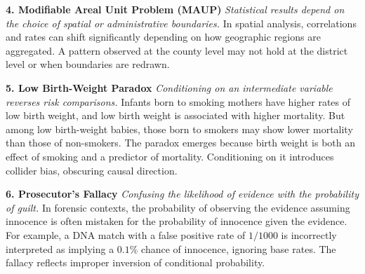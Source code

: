 \begin{tcolorbox}[
  colback=gray!2,
  colframe=gray!60,
  boxrule=0.4pt,
  width=\textwidth,
  arc=1pt,
  left=8pt,
  right=8pt,
  top=6pt,
  bottom=6pt,
  shadow={0mm}{-0.5mm}{0mm}{gray!30}
]
\textbf{4. Modifiable Areal Unit Problem (MAUP)}  
\emph{Statistical results depend on the choice of spatial or administrative boundaries.}  
In spatial analysis, correlations and rates can shift significantly depending on how geographic regions are aggregated. A pattern observed at the county level may not hold at the district level or when boundaries are redrawn.

\vspace{1em}

\textbf{5. Low Birth-Weight Paradox}  
\emph{Conditioning on an intermediate variable reverses risk comparisons.}  
Infants born to smoking mothers have higher rates of low birth weight, and low birth weight is associated with higher mortality. But among low birth-weight babies, those born to smokers may show lower mortality than those of non-smokers. The paradox emerges because birth weight is both an effect of smoking and a predictor of mortality. Conditioning on it introduces collider bias, obscuring causal direction.

\vspace{1em}

\textbf{6. Prosecutor’s Fallacy}  
\emph{Confusing the likelihood of evidence with the probability of guilt.}  
In forensic contexts, the probability of observing the evidence assuming innocence is often mistaken for the probability of innocence given the evidence. For example, a DNA match with a false positive rate of $1/1000$ is incorrectly interpreted as implying a $0.1\%$ chance of innocence, ignoring base rates. The fallacy reflects improper inversion of conditional probability.

\end{tcolorbox}

